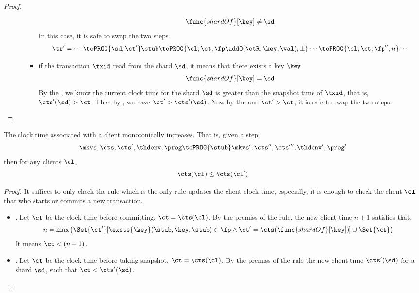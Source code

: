 \begin{proof}
\begin{itemize}
\begin{itemize}
\begin{itemize}
                \[
                    \func{shardOf}[\key] \neq \sd
                \]
            In this case, it is safe to swap the two steps
            \[
            \begin{array}{@{}l@{}}
            \tr' = \cdots \toPROG{\sd, \ct'} \stub \toPROG{\cl,\ct,\fp \addO (\otR, \key, \val),\perp} \cdots \toPROG{\cl,\ct,\fp'',n} \cdots \\
            \end{array}
            \]
            \item if the transaction \( \txid \) read from the shard \( \sd \), it means that there exists a key \( \key \)
            \[
                \func{shardOf}[\key] = \sd
            \]
            By the , we know the current clock time for the shard \( \sd \) is greater than the snapshot time of \( \txid \), 
            that is, \( \cts'(\sd) > \ct \).
            Then by ,  we have \( \ct' > \cts'(\sd) \).
            Now by the  and \( \ct' > \ct \), it is safe to swap the two steps.
        \end{itemize}
    \end{itemize}
    \end{itemize}
\end{proof}

\begin{lemma}
    \label{lem:mono-client-clock-time}
    The clock time associated with a client monotonically increases,
    That is, given a step
    \[
        \mkvs, \cts, \cts', \thdenv, \prog \toPROG{\stub} \mkvs', \cts'', \cts''', \thdenv', \prog'
    \]
    then for any clients \( \cl \),
    \[
        \cts(\cl) \leq \cts(\cl')
    \]
\end{lemma}
\begin{proof}
    It suffices to only check the  rule which is the only rule updates the client clock time,
    especially, it is enough to check the client \( \cl \) that who starts or commits a new transaction.
    \begin{itemize}
        \item {}.
            Let \( \ct \) be the clock time before committing, \( \ct = \cts(\cl)\).
            By the premiss of the rule, the new client time \( n + 1 \) satisfies that, 
            \[
                n = \max\left( \Set{\ct'}[\exsts{\key} (\stub, \key, \stub) \in \fp \land \ct' = \cts(\func{shardOf}[\key])] \cup \Set{\ct} \right)
            \]
            It means \( \ct < (n + 1)\).
        \item {}.
            Let \( \ct \) be the clock time before taking snapshot, \( \ct = \cts(\cl)\).
            By the premiss of the rule the new  client time \( \cts'(\sd) \) for a shard \( \sd \), 
            such that \( \ct < \cts'(\sd)  \).
    \end{itemize}
\end{proof}

